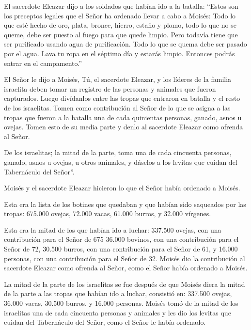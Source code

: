  El sacerdote Eleazar dijo a los soldados que habían ido a
la batalla: ``Estos son los preceptos legales que el Señor ha ordenado
llevar a cabo a Moisés:  Todo lo que esté hecho de oro,
plata, bronce, hierro, estaño y plomo,  todo lo que no se
queme, debe ser puesto al fuego para que quede limpio. Pero todavía
tiene que ser purificado usando agua de purificación. Todo lo que se
quema debe ser pasado por el agua.  Lava tu ropa en el
séptimo día y estarás limpio. Entonces podrás entrar en el campamento.''

 El Señor le dijo a Moisés,  Tú, el sacerdote
Eleazar, y los líderes de la familia israelita deben tomar un registro
de las personas y animales que fueron capturados.  Luego
divídanlos entre las tropas que entraron en batalla y el resto de los
israelitas.  Tomen como contribución al Señor de lo que se
asigna a las tropas que fueron a la batalla una de cada quinientas
personas, ganado, asnos u ovejas.  Tomen esto de su media
parte y denlo al sacerdote Eleazar como ofrenda al Señor.

 De los israelitas; la mitad de la parte, toma una de cada
cincuenta personas, ganado, asnos u ovejas, u otros animales, y dáselos
a los levitas que cuidan del Tabernáculo del Señor''.

 Moisés y el sacerdote Eleazar hicieron lo que el Señor
había ordenado a Moisés.

 Esta era la lista de los botines que quedaban y que habían
sido saqueados por las tropas: 675.000 ovejas,  72.000
vacas,  61.000 burros,  y 32.000 vírgenes.

 Esta era la mitad de los que habían ido a luchar: 337.500
ovejas,  con una contribución para el Señor de 675
 36.000 bovinos, con una contribución para el Señor de 72,
 30.500 burros, con una contribución para el Señor de 61,
 y 16.000 personas, con una contribución para el Señor de
32.  Moisés dio la contribución al sacerdote Eleazar como
ofrenda al Señor, como el Señor había ordenado a Moisés.

 La mitad de la parte de los israelitas se fue después de
que Moisés diera la mitad de la parte a las tropas que habían ido a
luchar,  consistió en: 337.500 ovejas,  36.000
vacas,  30.500 burros,  y 16.000 personas.
 Moisés tomó de la mitad de los israelitas una de cada
cincuenta personas y animales y les dio los levitas que cuidan del
Tabernáculo del Señor, como el Señor le había ordenado.

